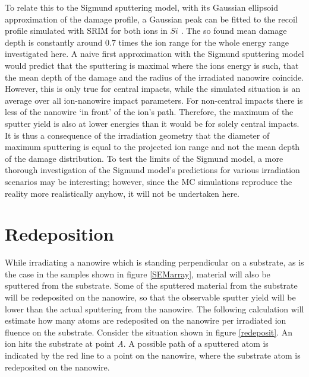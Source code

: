 To relate this to the Sigmund sputtering model, with its Gaussian ellipsoid approximation of the damage profile, a Gaussian peak can be fitted to the recoil profile simulated with SRIM for both ions in $Si$ \cite{bobes_ion_2012}. The so found mean damage depth is constantly around $0.7$ times the ion range for the whole energy range investigated here. A naive first approximation with the Sigmund sputtering model would predict that the sputtering is maximal where the ions energy is such, that the mean depth of the damage and the radius of the irradiated nanowire coincide. However, this is only true for central impacts, while the simulated situation is an average over all ion-nanowire impact parameters. For non-central impacts there is less of the nanowire `in front' of the ion's path. Therefore, the maximum of the sputter yield is also at lower energies than it would be for solely central impacts. It is thus a consequence of the irradiation geometry that the diameter of maximum sputtering is equal to the projected ion range and not the mean depth of the damage distribution. To test the limits of the Sigmund model, a more thorough investigation of the Sigmund model's predictions for various irradiation scenarios may be interesting; however, since the MC simulations reproduce the reality more realistically anyhow, it will not be undertaken here.


\vfill
\section{Redeposition}
\label{sec:redeposition}

While irradiating a nanowire which is standing perpendicular on a substrate, as is the case in the samples shown in figure \ref{SEMarray}, material will also be sputtered from the substrate. Some of the sputtered material from the substrate will be redeposited on the nanowire, so that the observable sputter yield will be lower than the actual sputtering from the nanowire. The following calculation will estimate how many atoms are redeposited on the nanowire per irradiated ion fluence on the substrate. Consider the situation shown in figure \ref{redeposit}. An ion hits the substrate at point \emph{A}. A possible path of a sputtered atom is indicated by the red line to a point on the nanowire, where the substrate atom is redeposited on the nanowire. 

